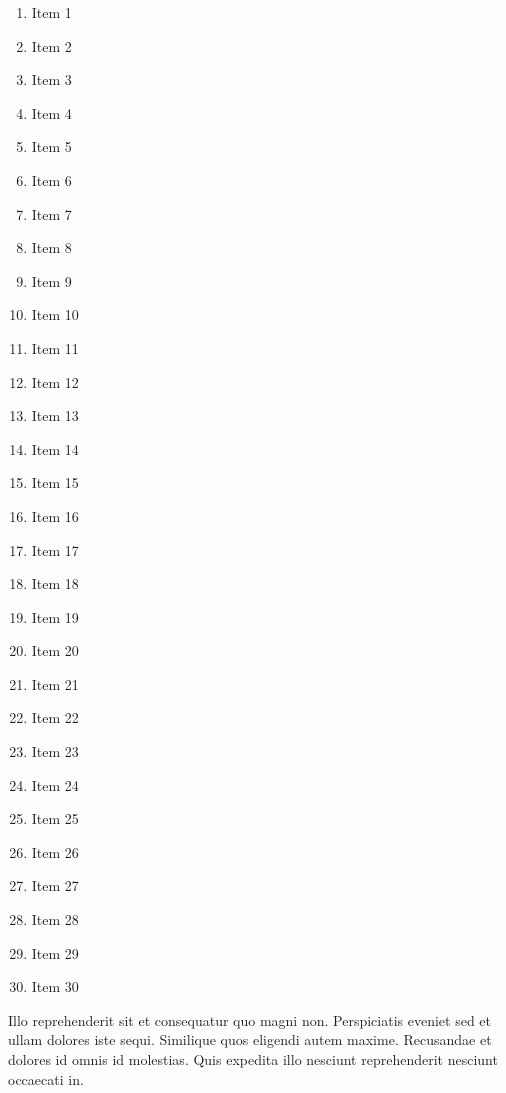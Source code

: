 \documentclass[12pt,a4paper]{article}
\begin{document}
\begin{multicols}{2}

\begin{enumerate}

	\item Item 1
	\item Item 2
	\item Item 3
	\item Item 4
	\item Item 5
	\item Item 6
	\item Item 7
	\item Item 8
	\item Item 9
	\item Item 10
	\item Item 11
	\item Item 12
	\item Item 13
	\item Item 14
	\item Item 15
	\item Item 16
	\item Item 17
	\item Item 18
	\item Item 19
	\item Item 20
	\item Item 21
	\item Item 22
	\item Item 23
	\item Item 24
	\item Item 25
	\item Item 26
	\item Item 27
	\item Item 28
	\item Item 29
	\item Item 30


\end{enumerate}

\lipsum






\lipsum

\end{multicols}



\par Illo reprehenderit sit et consequatur quo magni non. Perspiciatis eveniet sed et ullam dolores iste sequi. Similique quos eligendi autem maxime. Recusandae et dolores id omnis id molestias. Quis expedita illo nesciunt reprehenderit nesciunt occaecati in.
\end{document}

